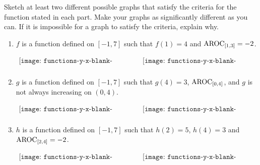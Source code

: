 \documentclass[nooutcomes]{ximera}
\begin{document}
\begin{exploration}
Sketch at least two different possible graphs that satisfy the criteria for the function stated in each part.  Make your graphs as significantly different as you can.  If it is impossible for a graph to satisfy the criteria, explain why.



\begin{enumerate}[label=\alph*.]
\item 
$f$ is a function defined on $[-1,7]$ such that $f(1) = 4$ and $\mathrm{AROC}_{[1,3]} = -2$.

	\begin{center}
	$
	\begin{array}{ccc}
	{
	\texttt{[image: functions-y-x-blank-axes.pdf]}
	}&&
	{
	\texttt{[image: functions-y-x-blank-axes.pdf]}
	}\\
	\end{array}
	$
	\end{center}

\item $g$ is a function defined on $[-1,7]$ such that $g(4) = 3$, $\mathrm{AROC}_{[0,4]}$, and $g$ is not always increasing on $(0,4)$.

	\begin{center}
	$
	\begin{array}{ccc}
	{
	\texttt{[image: functions-y-x-blank-axes.pdf]}
	}&&
	{
	\texttt{[image: functions-y-x-blank-axes.pdf]}
	}\\
	\end{array}
	$
	\end{center}


\item $h$ is a function defined on $[-1,7]$ such that $h(2) = 5$, $h(4) = 3$ and $\mathrm{AROC}_{[2,4]} = -2$.

	\begin{center}
	$
	\begin{array}{ccc}
	{
	\texttt{[image: functions-y-x-blank-axes.pdf]}
	}&&
	{
	\texttt{[image: functions-y-x-blank-axes.pdf]}
	}\\
	\end{array}
	$
	\end{center}

\end{enumerate}
\end{exploration}
\end{document}
